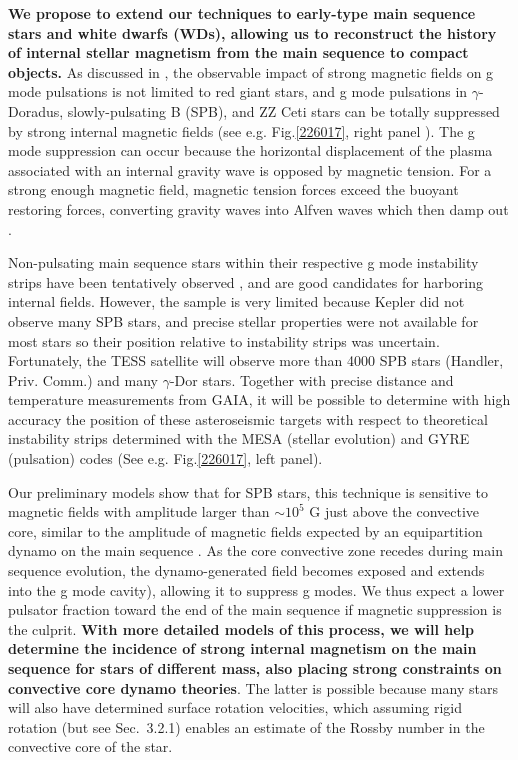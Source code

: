 \textbf{ We propose to extend our techniques to early-type main sequence stars and white dwarfs (WDs), allowing us to reconstruct the history of internal stellar magnetism from the main sequence to compact objects.} As discussed in \citet{Cantiello_2016}, the observable impact of strong magnetic fields on g mode pulsations is not limited to red giant stars, and g mode pulsations in $\gamma$-Doradus, slowly-pulsating B (SPB), and ZZ Ceti stars can be totally suppressed by strong internal magnetic fields (see e.g. Fig.\ref{226017}, right panel ). {\color{green} The g mode suppression can occur because the horizontal displacement of the plasma associated with an internal gravity wave is opposed by magnetic tension. For a strong enough magnetic field, magnetic tension forces exceed the buoyant restoring forces, converting gravity waves into Alfven waves which then damp out \cite{lecoanet:17}.}

Non-pulsating main sequence stars within their respective g mode instability strips have been tentatively observed \citep{Balona_2011}, and are good candidates for harboring internal fields.
However, the sample is very limited because Kepler did not observe many SPB stars, and precise stellar properties were not available for most stars so their position relative to instability strips was uncertain. Fortunately, the TESS satellite will observe more than 4000 SPB stars (Handler, Priv. Comm.) and many $\gamma$-Dor stars. Together with precise distance and temperature measurements from GAIA, it will be possible to determine with high accuracy the position of these asteroseismic targets with respect to theoretical instability strips determined with the MESA (stellar evolution) and GYRE (pulsation) codes (See e.g. Fig.\ref{226017}, left panel). 

Our preliminary models show that for SPB stars, this technique is sensitive to magnetic fields with amplitude larger than $\sim \! 10^5$ G just above the convective core, similar to the amplitude of magnetic fields expected by an equipartition dynamo on the main sequence \citep[See e.g.][]{Featherstone_2009,Augustson_2016}. As the core convective zone recedes during main sequence evolution, the dynamo-generated field becomes exposed and extends into the g mode cavity), allowing it to suppress g modes. We thus expect a lower pulsator fraction toward the end of the main sequence if magnetic suppression is the culprit. \textbf{With more detailed models of this process, we will help determine the incidence of strong internal magnetism on the main sequence for stars of different mass, also placing strong constraints on convective core dynamo theories}. The latter is possible because many stars will also have determined surface rotation velocities, which assuming rigid rotation (but see Sec.~3.2.1) enables an estimate of the Rossby number in the convective core of the star.

